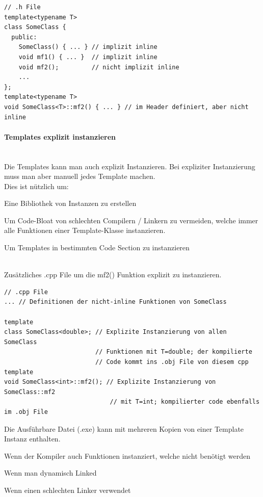 \begin{lstlisting}
// .h File
template<typename T>
class SomeClass {
  public:
    SomeClass() { ... } // implizit inline
    void mf1() { ... }  // implizit inline
    void mf2();         // nicht implizit inline
    ...
};
template<typename T>
void SomeClass<T>::mf2() { ... } // im Header definiert, aber nicht inline
\end{lstlisting}


\paragraph{Templates explizit instanzieren}~
\\
Die Templates kann man auch explizit Instanzieren. Bei expliziter Instanzierung muss man aber manuell jedes Template machen.\\

Dies ist nützlich um:
\begin{compactitem}
	\item Eine Bibliothek von Instanzen zu erstellen
	\item Um Code-Bloat von schlechten Compilern / Linkern zu vermeiden, welche immer alle Funktionen einer Template-Klasse instanzieren.
	\item Um Templates in bestimmten Code Section zu instanzieren
\end{compactitem}~\\

Zusätzliches .cpp File um die mf2() Funktion explizit zu instanzieren.
\begin{lstlisting}
// .cpp File
... // Definitionen der nicht-inline Funktionen von SomeClass

template
class SomeClass<double>; // Explizite Instanzierung von allen SomeClass
                         // Funktionen mit T=double; der kompilierte
                         // Code kommt ins .obj File von diesem cpp
template
void SomeClass<int>::mf2(); // Explizite Instanzierung von SomeClass::mf2
                             // mit T=int; kompilierter code ebenfalls im .obj File
\end{lstlisting}

Die Ausführbare Datei (.exe) kann mit mehreren Kopien von einer Template Instanz enthalten.
\begin{compactitem}
    \item Wenn der Kompiler auch Funktionen instanziert, welche nicht benötigt werden
    \item Wenn man dynamisch Linked
    \item Wenn einen schlechten Linker verwendet
\end{compactitem}

